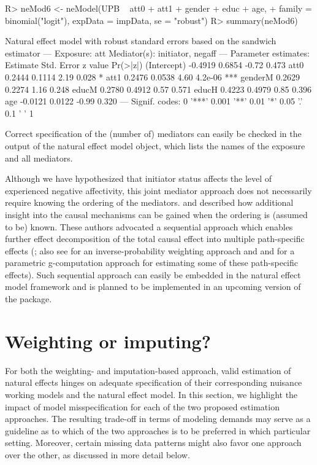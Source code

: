 \documentclass[nojss]{jss}
\begin{document}
\begin{Schunk}
\begin{Sinput}
R> neMod6 <- neModel(UPB ~ att0 + att1 + gender + educ + age,
+    family = binomial("logit"), expData = impData, se = "robust")
R> summary(neMod6)
\end{Sinput}
\begin{Soutput}
Natural effect model
with robust standard errors based on the sandwich estimator
---
Exposure: att 
Mediator(s): initiator, negaff 
---
Parameter estimates:
            Estimate Std. Error z value Pr(>|z|)    
(Intercept)  -0.4919     0.6854   -0.72    0.473    
att0          0.2444     0.1114    2.19    0.028 *  
att1          0.2476     0.0538    4.60  4.2e-06 ***
genderM       0.2629     0.2274    1.16    0.248    
educM         0.2780     0.4912    0.57    0.571    
educH         0.4223     0.4979    0.85    0.396    
age          -0.0121     0.0122   -0.99    0.320    
---
Signif. codes:  0 '***' 0.001 '**' 0.01 '*' 0.05 '.' 0.1 ' ' 1
\end{Soutput}
\end{Schunk}
Correct specification of the (number of) mediators can easily be checked in the  output of the natural effect model object, which lists the names of the exposure and all mediators. 
\par Although we have hypothesized that initiator status affects the level of experienced negative affectivity, this joint mediator approach does not necessarily require knowing the ordering of the mediators. \cite{VanderWeele2013b} and \cite{VanderWeele2014} described how additional insight into the causal mechanisms can be gained when the ordering is (assumed to be) known. These authors advocated a sequential approach which enables further effect decomposition of the total causal effect into multiple path-specific effects (\citealt{Avin2005}; also see \citealt{Huber2013} for an inverse-probability weighting approach and \citealt{Albert2011} and \citealt{Daniel2015} for a parametric g-computation approach for estimating some of these path-specific effects). Such sequential approach can easily be embedded in the natural effect model framework and is planned to be implemented in an upcoming version of the  package.

\section{Weighting or imputing?}\label{weightimp}
For both the weighting- and imputation-based approach, valid estimation of natural effects hinges on adequate specification of their corresponding nuisance working models and the natural effect model. In this section, we highlight the impact of model misspecification for each of the two proposed estimation approaches. The resulting trade-off in terms of modeling demands may serve as a guideline as to which of the two approaches is to be preferred in which particular setting. Moreover, certain missing data patterns might also favor one approach over the other, as discussed in more detail below.
\end{document}
